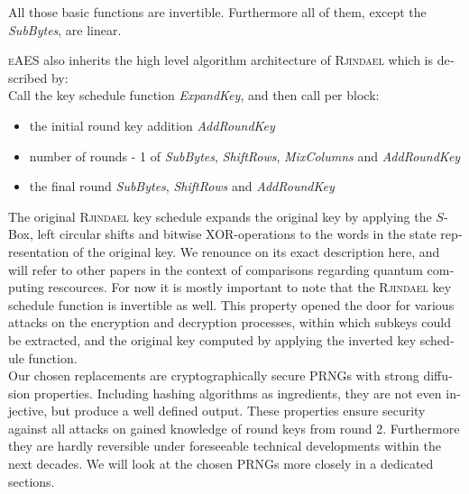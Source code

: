 \documentclass[a4paper,11pt]{article}
\begin{document}
\begin{otherlanguage}{english}
\begin{multicols}{2}
\begin{itemize} 
\end{itemize} 

\vspace{0.2cm}
\noindent
All those basic functions are invertible. Furthermore all of them, except the \textit{SubBytes}, are linear. \\



\noindent
\textsc{eAES} also inherits the high level algorithm architecture of \textsc{Rjindael} which is described by: \\

\noindent
Call the key schedule function \textit{ExpandKey}, and then call per block:
\vspace{0.2cm}
\begin{itemize} [noitemsep, nolistsep]
  \item[1)] the initial round key addition \textit{AddRoundKey}
  \item[2)] number of rounds - 1 of \textit{SubBytes}, \textit{ShiftRows}, \textit{MixColumns} and \textit{AddRoundKey}
  \item[3)] the final round \textit{SubBytes}, \textit{ShiftRows} and \textit{AddRoundKey}
\end{itemize}
\vspace{0.5cm}


\noindent
The original \textsc{Rjindael} key schedule expands the original key by applying the $S$-Box, left circular shifts and bitwise XOR-operations to the words in the state representation of the original key. We renounce on its exact description here, and will refer to other papers in the context of comparisons regarding quantum computing rescources. For now it is mostly important to note that the \textsc{Rjindael} key schedule function is invertible as well. This property opened the door for various attacks on the encryption and decryption processes, within which subkeys could be extracted, and the original key computed by applying the inverted key schedule function.\\

\noindent
Our chosen replacements are cryptographically secure PRNGs with strong diffusion properties. Including hashing algorithms as ingredients, they are not even injective, but produce a well defined output. These properties ensure security against all attacks on gained knowledge of round keys from round 2. Furthermore they are hardly reversible under foreseeable technical developments within the next decades. We will look at the chosen PRNGs more closely in a dedicated sections.\\


\end{multicols}
\end{otherlanguage}
\end{document}
